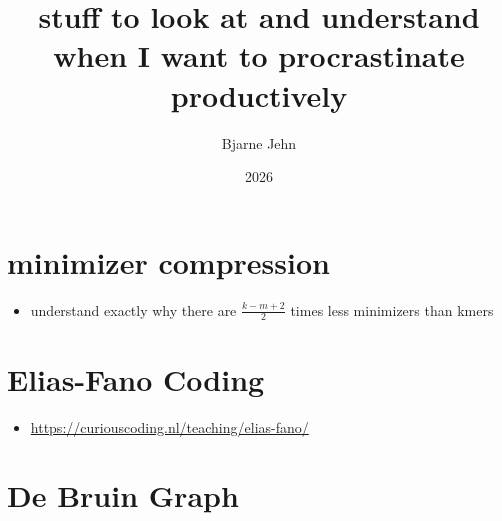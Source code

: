 \documentclass{article}
\title{stuff to look at and understand when I want to procrastinate productively}
\author{Bjarne Jehn}
\date{2026}
\begin{document}
	
\maketitle
\section*{minimizer compression}
\begin{itemize}
	\item understand exactly why there are $\frac{k-m+2}{2}$ times less minimizers than kmers
\end{itemize}

\section*{Elias-Fano Coding}
\begin{itemize}
	\item \url{https://curiouscoding.nl/teaching/elias-fano/}
\end{itemize}

\section*{De Bruin Graph}
	
	
\end{document}
